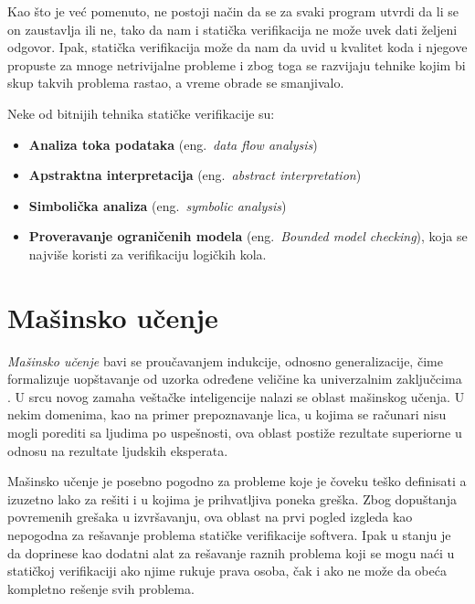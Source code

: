 \documentclass[a4paper]{article}
\theoremstyle{definition}
\begin{document}
{\par Kao što je već pomenuto, ne postoji način da se za svaki program utvrdi da li se on zaustavlja ili ne, tako da nam i statička verifikacija ne može uvek dati željeni odgovor. Ipak, statička verifikacija može da nam da uvid u kvalitet koda i njegove propuste za mnoge netrivijalne probleme i zbog toga se razvijaju tehnike kojim bi skup takvih problema rastao, a vreme obrade se smanjivalo. 

\par Neke od bitnijih tehnika statičke verifikacije su:
\begin{itemize}
\item \textbf{Analiza toka podataka} (eng.~{\em data flow analysis})
\item \textbf{Apstraktna interpretacija} (eng.~{\em abstract interpretation})
\item \textbf{Simbolička analiza} (eng.~{\em symbolic analysis})
\item \textbf{Proveravanje ograničenih modela} (eng.~{\em Bounded model che\-cking}), koja se najviše koristi za verifikaciju logičkih kola.
\end{itemize}


\section{Mašinsko učenje}

\par \textit{Mašinsko učenje} bavi se proučavanjem indukcije, odnosno generalizacije, čime formalizuje uopštavanje od uzorka određene veličine ka univerzalnim zaključcima \cite{bishopML}. U srcu novog zamaha veštačke inteligencije nalazi se oblast mašinskog učenja. U nekim domenima, kao na primer prepoznavanje lica, u kojima se računari nisu mogli porediti sa ljudima po uspešnosti, ova oblast postiže rezultate superiorne u odnosu na rezultate ljudskih eksperata.


\par Mašinsko učenje je posebno pogodno za probleme koje je čoveku teško definisati a izuzetno lako za rešiti i u kojima je prihvatljiva poneka greška. Zbog dopuštanja povremenih grešaka u izvršavanju, ova oblast na prvi pogled izgleda kao nepogodna za rešavanje problema statičke verifikacije softvera. Ipak u stanju je da doprinese kao dodatni alat za rešavanje raznih problema koji se mogu naći u statičkoj verifikaciji ako njime rukuje prava osoba, čak i ako ne može da obeća kompletno rešenje svih problema.

}
\end{document}
